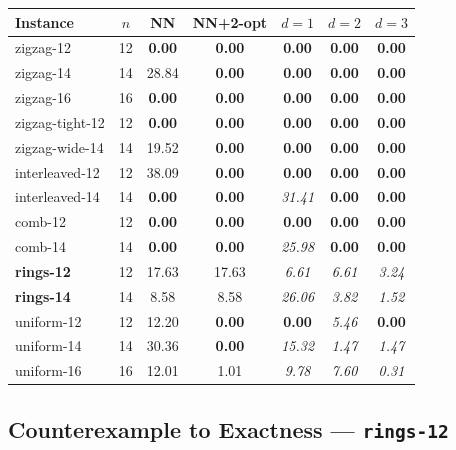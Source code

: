 \documentclass[11pt,a4paper]{article}
\begin{document}
\begin{center}
\begin{tabular}{lcccccc}
\toprule
Instance & $n$ & NN & NN+2-opt & $d{=}1$ & $d{=}2$ & $d{=}3$ \\
\midrule
zigzag-12        & 12 & \textbf{0.00} & \textbf{0.00} & \textbf{0.00} & \textbf{0.00} & \textbf{0.00} \\
zigzag-14        & 14 & 28.84         & \textbf{0.00} & \textbf{0.00} & \textbf{0.00} & \textbf{0.00} \\
zigzag-16        & 16 & \textbf{0.00} & \textbf{0.00} & \textbf{0.00} & \textbf{0.00} & \textbf{0.00} \\
zigzag-tight-12  & 12 & \textbf{0.00} & \textbf{0.00} & \textbf{0.00} & \textbf{0.00} & \textbf{0.00} \\
zigzag-wide-14   & 14 & 19.52         & \textbf{0.00} & \textbf{0.00} & \textbf{0.00} & \textbf{0.00} \\
interleaved-12   & 12 & 38.09         & \textbf{0.00} & \textbf{0.00} & \textbf{0.00} & \textbf{0.00} \\
interleaved-14   & 14 & \textbf{0.00} & \textbf{0.00} & \textit{31.41} & \textbf{0.00} & \textbf{0.00} \\
comb-12          & 12 & \textbf{0.00} & \textbf{0.00} & \textbf{0.00} & \textbf{0.00} & \textbf{0.00} \\
comb-14          & 14 & \textbf{0.00} & \textbf{0.00} & \textit{25.98} & \textbf{0.00} & \textbf{0.00} \\
\textbf{rings-12} & 12 & 17.63 & 17.63 & \textit{6.61} & \textit{6.61} & \textit{3.24} \\
\textbf{rings-14} & 14 & 8.58  & 8.58  & \textit{26.06} & \textit{3.82} & \textit{1.52} \\
uniform-12       & 12 & 12.20 & \textbf{0.00} & \textbf{0.00} & \textit{5.46} & \textbf{0.00} \\
uniform-14       & 14 & 30.36 & \textbf{0.00} & \textit{15.32} & \textit{1.47} & \textit{1.47} \\
uniform-16       & 16 & 12.01 & 1.01          & \textit{9.78}  & \textit{7.60} & \textit{0.31} \\
\bottomrule
\end{tabular}
\end{center}

\subsection{Counterexample to Exactness --- \texttt{rings-12}}
\end{document}

